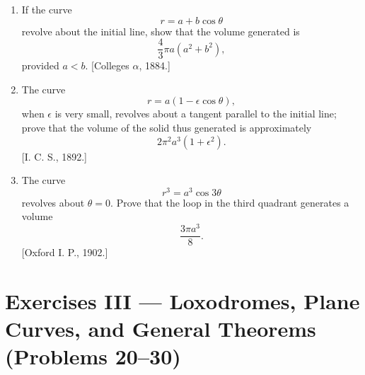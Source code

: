 \documentclass[11pt, a4paper]{article}
\newcommand{\source}[1]{\hfill\textnormal{[#1]}}
\begin{document}
\begin{enumerate}[leftmargin=2em]
\item[17.] If the curve
\[
r=a+b\cos\theta
\]
revolve about the initial line, show that the volume generated is
\[
\frac{4}{3}\pi a(a^2+b^2),
\]
provided $a<b$.
\source{Colleges $\alpha$, 1884.}

\item[18.] The curve
\[
r=a(1-\epsilon\cos\theta),
\]
when $\epsilon$ is very small, revolves about a tangent parallel to the initial line; prove that the volume of the solid thus generated is approximately
\[
2\pi^2a^3(1+\epsilon^2).
\]
\source{I. C. S., 1892.}

\item[19.] The curve
\[
r^3=a^3\cos 3\theta
\]
revolves about $\theta=0$. Prove that the loop in the third quadrant generates a volume
\[
\frac{3\pi a^3}{8}.
\]
\source{Oxford I. P., 1902.}

\end{enumerate}

\section*{Exercises III --- Loxodromes, Plane Curves, and General Theorems (Problems 20--30)}
\end{document}
